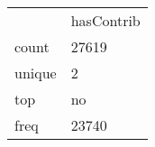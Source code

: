 \begin{tabular}{ll}
 & hasContrib \\
count & 27619 \\
unique & 2 \\
top & no \\
freq & 23740 \\
\end{tabular}
